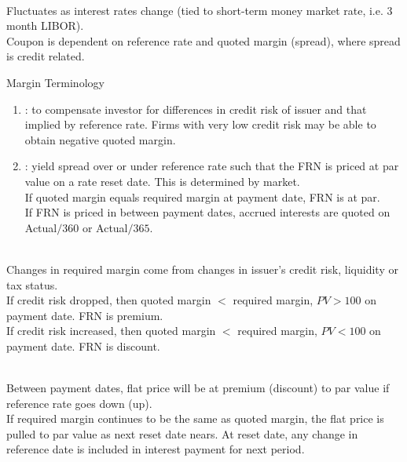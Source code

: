 \begin{remark} \\
Fluctuates as interest rates change (tied to short-term money market rate, i.e. 3 month LIBOR).\\
Coupon is dependent on reference rate and quoted margin (spread), where spread is credit related.
\end{remark}

\begin{definition} Margin Terminology
\begin{enumerate}[label=\roman*.]
\setlength{\itemsep}{0pt}
\item {}: to compensate investor for differences in credit risk of issuer and that implied by reference rate. Firms with very low credit risk may be able to obtain negative quoted margin.
\item {}: yield spread over or under reference rate such that the FRN is priced at par value on a rate reset date. This is determined by market.\\
If quoted margin equals required margin at payment date, FRN is at par.\\
If FRN is priced in between payment dates, accrued interests are quoted on Actual$/360$ or Actual$/365$.
\end{enumerate}
\end{definition}

\begin{remark} \\
Changes in required margin come from changes in issuer’s credit risk, liquidity or tax status.\\
If credit risk dropped, then quoted margin $<$ required margin, $PV > 100$ on payment date. FRN is premium.\\
If credit risk increased, then quoted margin $<$ required margin, $PV < 100$ on payment date. FRN is discount.
\end{remark}

\begin{remark} \\
Between payment dates, flat price will be at premium (discount) to par value if reference rate goes down (up).\\
If required margin continues to be the same as quoted margin, the flat price is pulled to par value as next reset date nears.
At reset date, any change in reference date is included in interest payment for next period.
\end{remark}

